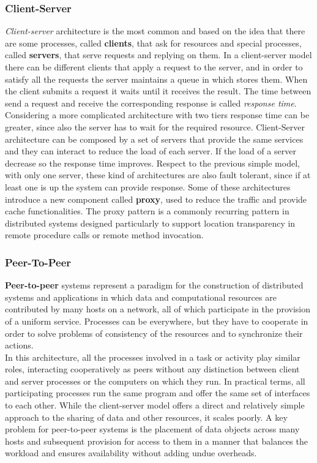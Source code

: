 \documentclass[11pt,a4paper]{article}
\begin{document}
\subsubsection{Client-Server}
\textit{Client-server} architecture is the most common and based on the idea that there are some processes, called \textbf{clients}, that ask for resources and special processes, called \textbf{servers}, that serve requests and replying on them. In a client-server model there can be different clients that apply a request to the server, and in order to satisfy all the requests the server maintains a queue in which stores them. When the client submits a request it waits until it receives the result. The time between send a request and receive the corresponding response is called \textit{response time}.
Considering a more complicated architecture with two tiers response time can be greater, since also the server has to wait for the required resource.
Client-Server architecture can be composed by a set of servers that provide the same services and they can interact to reduce the load of each server. If the load of a server decrease so the response time improves. Respect to the previous simple model, with only one server, these kind of architectures are also fault tolerant, since if at least one is up the system can provide response.
Some of these architectures introduce a new component called \textbf{proxy}, used to reduce the traffic and provide cache functionalities. The proxy pattern is a commonly recurring pattern in distributed systems designed particularly to support location transparency in remote procedure calls or remote method invocation.

\subsubsection{Peer-To-Peer}
\textbf{Peer-to-peer} systems represent a paradigm for the construction of distributed systems and applications in which data and computational resources are contributed by many hosts on a network, all of which participate in the provision of a uniform service.
Processes can be everywhere, but they have to cooperate in order to solve problems of consistency of the resources and to synchronize their actions.\\
In this architecture, all the processes involved in a task or activity play similar roles, interacting cooperatively as peers without any distinction between client and server processes or the computers on which they run. In practical terms, all participating processes run the same program and offer the same set of interfaces to each other. While the client-server model offers a direct and relatively simple approach to the sharing of data and other resources, it scales poorly.
A key problem for peer-to-peer systems is the placement of data objects across many hosts and subsequent provision for access to them in a manner that balances the workload and ensures availability without adding undue overheads.
\end{document}

